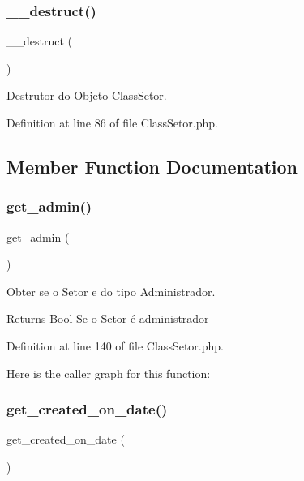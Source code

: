 \subsubsection{\texorpdfstring{\+\_\+\+\_\+destruct()}{\_\_destruct()}}
{\footnotesize\ttfamily \+\_\+\+\_\+destruct (\begin{DoxyParamCaption}{ }\end{DoxyParamCaption})}



Destrutor do Objeto \hyperlink{class_class_setor}{Class\+Setor}. 



Definition at line 86 of file Class\+Setor.\+php.



\subsection{Member Function Documentation}
\mbox{\label{class_class_setor_aae367241584b2f61c523f167cbafee01}} 
\subsubsection{\texorpdfstring{get\+\_\+admin()}{get\_admin()}}
{\footnotesize\ttfamily get\+\_\+admin (\begin{DoxyParamCaption}{ }\end{DoxyParamCaption})}



Obter se o Setor e do tipo Administrador. 

\begin{DoxyReturn}{Returns}
Bool Se o Setor é administrador 
\end{DoxyReturn}


Definition at line 140 of file Class\+Setor.\+php.

Here is the caller graph for this function\+:
\mbox{\label{class_class_setor_a9a1ef394f9aef6ab037f8bb37209242f}} 
\subsubsection{\texorpdfstring{get\+\_\+created\+\_\+on\+\_\+date()}{get\_created\_on\_date()}}
{\footnotesize\ttfamily get\+\_\+created\+\_\+on\+\_\+date (\begin{DoxyParamCaption}{ }\end{DoxyParamCaption})}



